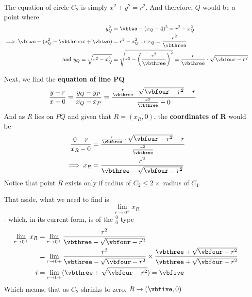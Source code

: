 \begin{solution}[\fullpage]
  The equation of circle $C_2$ is simply $x^2 + y^2 = r^2$.
  And therefore, $Q$ would be a point where 
  \begin{align}
    y_Q^2 &= \vbtwo - (x_Q-\vbone)^2 = r^2 - x_Q^2 \\
    \implies \vbtwo - (x_Q^2 - \vbthree x + \vbtwo) &= r^2 - x_Q^2 \text{ or } x_Q = \dfrac{r^2} {\vbthree} \\
    \text{ and }y_Q = \sqrt{r^2 - x_Q^2} &= \sqrt{r^2 - \left( \dfrac{r^2}{\vbthree}\right)^2}
    = \dfrac{r}{\vbthree}\cdot\sqrt{\vbfour - r^2}
  \end{align}
  
  Next, we find the \textbf{equation of line PQ}
  \begin{align}
    \dfrac{y-r}{x-0} &= \dfrac{y_Q-y_P}{x_Q-x_P} = 
    \dfrac{\frac{r}{\vbthree}\cdot\sqrt{\vbfour-r^2}-r}{\frac{r^2}{\vbthree} - 0}
  \end{align}
  And as $R$ lies on $PQ$ and given that $R=(x_R,0)$, the \textbf{coordinates of R} would be 
  \begin{align}
    \dfrac{0-r}{x_R-0} &= \dfrac{\frac{r}{\vbthree}\cdot\sqrt{\vbfour-r^2}-r}{\frac{r^2}{\vbthree}} \\
    \implies x_R &= \dfrac{r^2}{\vbthree - \sqrt{\vbfour - r^2}}
  \end{align}
  Notice that point $R$ exists only if radius of $C_2\leq 2\times$ radius of $C_1$.
  
  That aside, what we need to find is \[ \lim_{r\to 0^+} x_R\] - which, in its current form, 
  is of the $\frac{0}{0}$ type
  \begin{align}
    \lim_{r\to 0^+}x_R &= \lim_{r\to 0^+}\dfrac{r^2}{\vbthree - \sqrt{\vbfour - r^2}} \\
    &= \lim_{r\to 0+}\dfrac{r^2}{\vbthree - \sqrt{\vbfour - r^2}}\times
    \dfrac{\vbthree + \sqrt{\vbfour - r^2}}{\vbthree + \sqrt{\vbfour - r^2}} \\
 i   &= \lim_{r\to 0+}(\vbthree + \sqrt{\vbfour - r^2}) = \vbfive
  \end{align}
  Which means, that as $C_2$ shrinks to zero, $R\to (\vbfive, 0)$
\end{solution}
